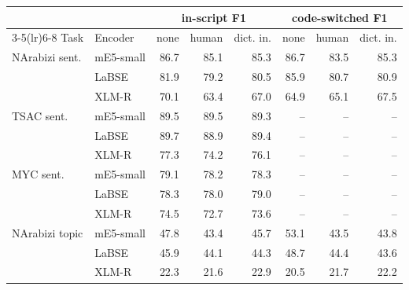 \begin{tabular}{ll rrr rrr}
\toprule
 & & \multicolumn{3}{c}{in-script F1} & \multicolumn{3}{c}{code-switched F1} \\
\cmidrule(lr){3-5}\cmidrule(lr){6-8}
Task & Encoder & none & human & dict. in. & none & human & dict. in. \\
\midrule
NArabizi sent. & mE5-small & 86.7 & 85.1 & 85.3 & 86.7 & 83.5 & 85.3 \\
 & LaBSE & 81.9 & 79.2 & 80.5 & 85.9 & 80.7 & 80.9 \\
 & XLM-R & 70.1 & 63.4 & 67.0 & 64.9 & 65.1 & 67.5 \\
TSAC sent. & mE5-small & 89.5 & 89.5 & 89.3 & -- & -- & -- \\
 & LaBSE & 89.7 & 88.9 & 89.4 & -- & -- & -- \\
 & XLM-R & 77.3 & 74.2 & 76.1 & -- & -- & -- \\
MYC sent. & mE5-small & 79.1 & 78.2 & 78.3 & -- & -- & -- \\
 & LaBSE & 78.3 & 78.0 & 79.0 & -- & -- & -- \\
 & XLM-R & 74.5 & 72.7 & 73.6 & -- & -- & -- \\
NArabizi topic & mE5-small & 47.8 & 43.4 & 45.7 & 53.1 & 43.5 & 43.8 \\
 & LaBSE & 45.9 & 44.1 & 44.3 & 48.7 & 44.4 & 43.6 \\
 & XLM-R & 22.3 & 21.6 & 22.9 & 20.5 & 21.7 & 22.2 \\
\bottomrule
\end{tabular}
